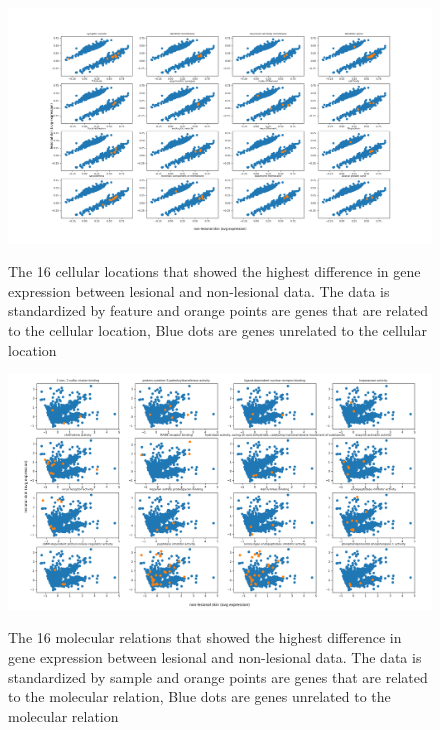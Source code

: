 \documentclass[10pt,a4paper]{article}
\begin{document}
	\begin{figure}[H]
		\includegraphics[width=1\textwidth]{Sign_Organelles_Psoriasis_Scaled.png}
		\label{fig:CellularScaledByFeature1}
		\caption{The 16 cellular locations that showed the highest difference in gene expression between lesional and non-lesional data. The data is standardized by feature and orange points are genes that are related to the cellular location, Blue dots are genes unrelated to the cellular location}
	\end{figure}

	\begin{figure}[H]
		\includegraphics[width=1\textwidth]{Sign_Molecular_Psoriasis.png}
		\label{fig:MolecularScaledBySample}
		\caption{The 16 molecular relations that showed the highest difference in gene expression between lesional and non-lesional data. The data is standardized by sample and orange points are genes that are related to the molecular relation, Blue dots are genes unrelated to the molecular relation}
	\end{figure}
	
\end{document}
